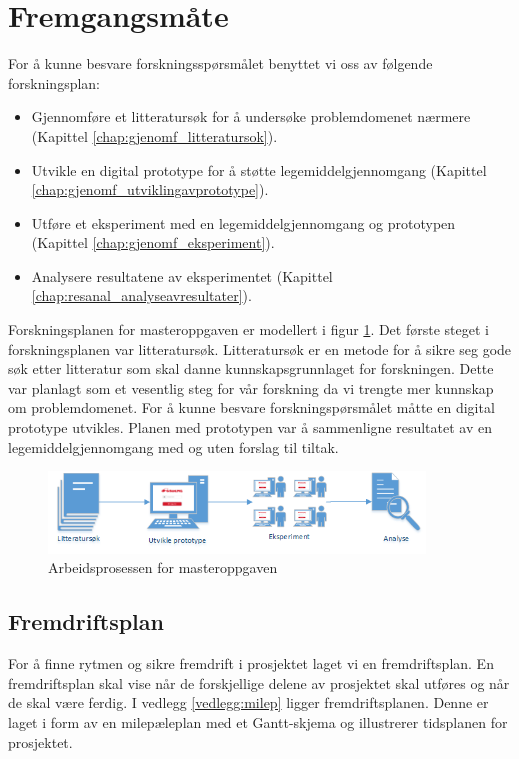 \section{Fremgangsmåte}
\label{chap:fremgangsmate}
For å kunne besvare forskningsspørsmålet benyttet vi oss av følgende forskningsplan:
\begin{itemize}
    \item Gjennomføre et litteratursøk for å undersøke problemdomenet nærmere (Kapittel \ref{chap:gjenomf_litteratursok}).
    \item Utvikle en digital prototype for å støtte legemiddelgjennomgang (Kapittel \ref{chap:gjenomf_utviklingavprototype}).
    \item Utføre et eksperiment med en legemiddelgjennomgang og prototypen (Kapittel \ref{chap:gjenomf_eksperiment}).
    \item Analysere resultatene av eksperimentet (Kapittel \ref{chap:resanal_analyseavresultater}).
\end{itemize}
Forskningsplanen for masteroppgaven er modellert i figur \ref{fig:arbeidsprossen}. Det første steget i forskningsplanen var litteratursøk. Litteratursøk er en metode for å sikre seg gode søk etter litteratur som skal danne kunnskapsgrunnlaget for forskningen. Dette var planlagt som et vesentlig steg for vår forskning da vi trengte mer kunnskap om problemdomenet. For å kunne besvare forskningspørsmålet måtte en digital prototype utvikles. Planen med prototypen var å sammenligne resultatet av en legemiddelgjennomgang med og uten forslag til tiltak.
\begin{figure}[H]
\begin{center}
\includegraphics[width=10cm]{images/Arbeidsprosessen}
\caption{Arbeidsprosessen for masteroppgaven}
\label{fig:arbeidsprossen}
\end{center}
\end{figure}
\subsection{Fremdriftsplan}
For å finne rytmen og sikre fremdrift i prosjektet laget vi en fremdriftsplan. En fremdriftsplan skal vise når de forskjellige delene av prosjektet skal utføres og når de skal være ferdig. I vedlegg \ref{vedlegg:milep} ligger fremdriftsplanen. Denne er laget i form av en milepæleplan med et Gantt-skjema og illustrerer tidsplanen for prosjektet. 

